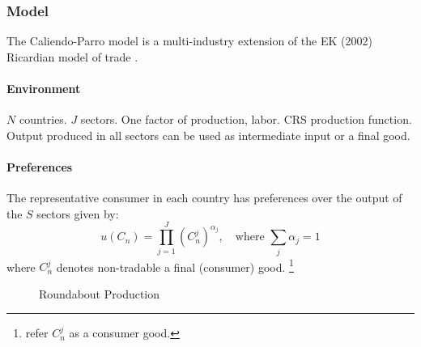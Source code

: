 \subsubsection{Model}
The Caliendo-Parro model is a multi-industry extension of the EK (2002) Ricardian model of trade \citep{Antras:2022}.
\paragraph{Environment}
$N$ countries.
$J$ sectors.
One factor of production, labor.
CRS production function.
Output produced in all sectors can be used as intermediate input or a final good.

\paragraph{Preferences}
The representative consumer in each country has preferences over the output of the $S$ sectors given by:
\begin{equation}
    u(C_n) = \prod_{j=1}^J \left(C_n^j \right)^{\alpha_j}, \quad \text{where } \sum_{j} \alpha_j = 1
\end{equation}
where $C_n^j$ denotes non-tradable a final (consumer) good.%
\footnote{
    \cite{Antras:2022} refer $C_n^j$ as a consumer good.
}

\begin{figure}[h!]
    \centering
    \caption{Roundabout Production}
\end{figure}

